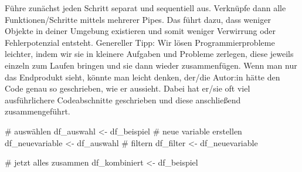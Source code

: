 \documentclass[
  letterpaper,
  DIV=11,
  numbers=noendperiod]{scrreprt}
\newenvironment{Shaded}{\begin{snugshade}}{\end{snugshade}}
\newcommand{\CommentTok}[1]{\textcolor[rgb]{0.37,0.37,0.37}{#1}}
\newcommand{\NormalTok}[1]{\textcolor[rgb]{0.00,0.23,0.31}{#1}}
\newcommand{\OtherTok}[1]{\textcolor[rgb]{0.00,0.23,0.31}{#1}}
\begin{document}
Führe zunächst jeden Schritt separat und sequentiell aus. Verknüpfe dann
alle Funktionen/Schritte mittels mehrerer Pipes. Das führt dazu, dass
weniger Objekte in deiner Umgebung existieren und somit weniger
Verwirrung oder Fehlerpotenzial entsteht. Genereller Tipp: Wir lösen
Programmierprobleme leichter, indem wir sie in kleinere Aufgaben und
Probleme zerlegen, diese jeweils einzeln zum Laufen bringen und sie dann
wieder zusammenfügen. Wenn man nur das Endprodukt sieht, könnte man
leicht denken, der/die Autor:in hätte den Code genau so geschrieben, wie
er aussieht. Dabei hat er/sie oft viel ausführlichere Codeabschnitte
geschrieben und diese anschließend zusammengeführt.

\begin{Shaded}
\begin{Highlighting}[]
\CommentTok{\# auswählen}
\NormalTok{ df\_auswahl }\OtherTok{\textless{}{-}}\NormalTok{ df\_beispiel}
\CommentTok{\# neue variable erstellen}
\NormalTok{df\_neuevariable }\OtherTok{\textless{}{-}}\NormalTok{ df\_auswahl}
\CommentTok{\# filtern}
\NormalTok{df\_filter }\OtherTok{\textless{}{-}}\NormalTok{ df\_neuevariable }

\CommentTok{\# jetzt alles zusammen}
\NormalTok{df\_kombiniert }\OtherTok{\textless{}{-}}\NormalTok{ df\_beispiel }
\end{Highlighting}
\end{Shaded}
\end{document}
